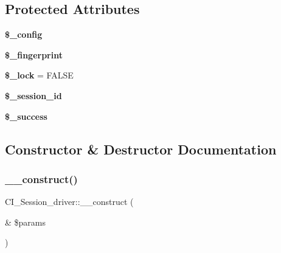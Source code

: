 \subsection*{Protected Attributes}
\begin{DoxyCompactItemize}
\item 
\mbox{\label{class_c_i___session__driver_a116c735f6922ccc22e0d84e06bc4c299}} 
{\bfseries \$\+\_\+config}
\item 
\mbox{\label{class_c_i___session__driver_a095e6524519dda4b480b460f4c0ba127}} 
{\bfseries \$\+\_\+fingerprint}
\item 
\mbox{\label{class_c_i___session__driver_aebc05320b6b0cd1e88ac7ea08aa6dab7}} 
{\bfseries \$\+\_\+lock} = F\+A\+L\+SE
\item 
\mbox{\label{class_c_i___session__driver_a9e94c7496f05e45e5a56e3f42af2ff8a}} 
{\bfseries \$\+\_\+session\+\_\+id}
\item 
\mbox{\label{class_c_i___session__driver_a8d9ec5a72fa5f8769af4642ffcddc0fb}} 
{\bfseries \$\+\_\+success}
\end{DoxyCompactItemize}


\subsection{Constructor \& Destructor Documentation}
\mbox{\label{class_c_i___session__driver_afa22ae0e78b82ad90c5a3a812a582d93}} 
\subsubsection{\texorpdfstring{\+\_\+\+\_\+construct()}{\_\_construct()}}
{\footnotesize\ttfamily C\+I\+\_\+\+Session\+\_\+driver\+::\+\_\+\+\_\+construct (\begin{DoxyParamCaption}\item[{\&}]{\$params }\end{DoxyParamCaption})}

